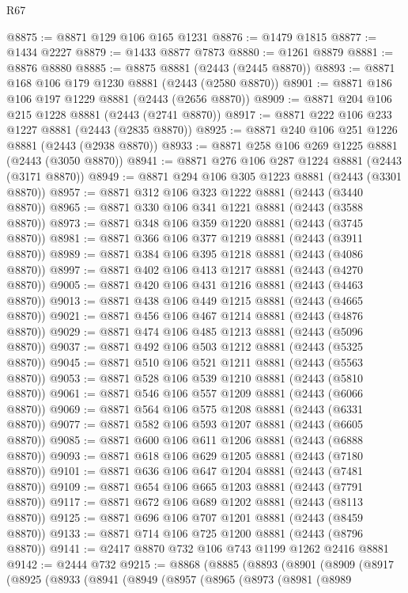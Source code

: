 \begin{lexlean}{R67}
\begin{coremodule}
@8875 := @8871 @129 @106 @165 @1231
@8876 := @1479 @1815
@8877 := @1434 @2227
@8879 := @1433 @8877 @7873
@8880 := @1261 @8879
@8881 := @8876 @8880
@8885 := @8875 @8881 (@2443 (@2445 @8870))
@8893 := @8871 @168 @106 @179 @1230 @8881 (@2443 (@2580 @8870))
@8901 := @8871 @186 @106 @197 @1229 @8881 (@2443 (@2656 @8870))
@8909 := @8871 @204 @106 @215 @1228 @8881 (@2443 (@2741 @8870))
@8917 := @8871 @222 @106 @233 @1227 @8881 (@2443 (@2835 @8870))
@8925 := @8871 @240 @106 @251 @1226 @8881 (@2443 (@2938 @8870))
@8933 := @8871 @258 @106 @269 @1225 @8881 (@2443 (@3050 @8870))
@8941 := @8871 @276 @106 @287 @1224 @8881 (@2443 (@3171 @8870))
@8949 := @8871 @294 @106 @305 @1223 @8881 (@2443 (@3301 @8870))
@8957 := @8871 @312 @106 @323 @1222 @8881 (@2443 (@3440 @8870))
@8965 := @8871 @330 @106 @341 @1221 @8881 (@2443 (@3588 @8870))
@8973 := @8871 @348 @106 @359 @1220 @8881 (@2443 (@3745 @8870))
@8981 := @8871 @366 @106 @377 @1219 @8881 (@2443 (@3911 @8870))
@8989 := @8871 @384 @106 @395 @1218 @8881 (@2443 (@4086 @8870))
@8997 := @8871 @402 @106 @413 @1217 @8881 (@2443 (@4270 @8870))
@9005 := @8871 @420 @106 @431 @1216 @8881 (@2443 (@4463 @8870))
@9013 := @8871 @438 @106 @449 @1215 @8881 (@2443 (@4665 @8870))
@9021 := @8871 @456 @106 @467 @1214 @8881 (@2443 (@4876 @8870))
@9029 := @8871 @474 @106 @485 @1213 @8881 (@2443 (@5096 @8870))
@9037 := @8871 @492 @106 @503 @1212 @8881 (@2443 (@5325 @8870))
@9045 := @8871 @510 @106 @521 @1211 @8881 (@2443 (@5563 @8870))
@9053 := @8871 @528 @106 @539 @1210 @8881 (@2443 (@5810 @8870))
@9061 := @8871 @546 @106 @557 @1209 @8881 (@2443 (@6066 @8870))
@9069 := @8871 @564 @106 @575 @1208 @8881 (@2443 (@6331 @8870))
@9077 := @8871 @582 @106 @593 @1207 @8881 (@2443 (@6605 @8870))
@9085 := @8871 @600 @106 @611 @1206 @8881 (@2443 (@6888 @8870))
@9093 := @8871 @618 @106 @629 @1205 @8881 (@2443 (@7180 @8870))
@9101 := @8871 @636 @106 @647 @1204 @8881 (@2443 (@7481 @8870))
@9109 := @8871 @654 @106 @665 @1203 @8881 (@2443 (@7791 @8870))
@9117 := @8871 @672 @106 @689 @1202 @8881 (@2443 (@8113 @8870))
@9125 := @8871 @696 @106 @707 @1201 @8881 (@2443 (@8459 @8870))
@9133 := @8871 @714 @106 @725 @1200 @8881 (@2443 (@8796 @8870))
@9141 := @2417 @8870 @732 @106 @743 @1199 @1262 @2416 @8881
@9142 := @2444 @732
@9215 := @8868
    (@8885
      (@8893
        (@8901
          (@8909
            (@8917
              (@8925
                (@8933
                  (@8941
                    (@8949
                      (@8957
                        (@8965
                          (@8973
                            (@8981
                              (@8989

\end{coremodule}
\end{lexlean}

